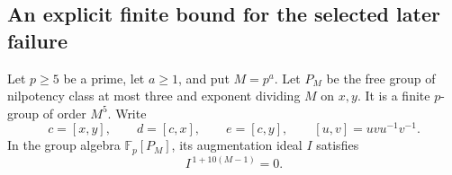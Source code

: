 \subsection{An explicit finite bound for the selected later failure}

\begin{lemma}
\label{lem:ghost-weighted-augmentation}
Let \(p\ge5\) be a prime, let \(a\ge1\), and put \(M=p^a\).
Let \(P_M\) be the free group of nilpotency class at most three
and exponent dividing \(M\) on \(x,y\). It is a finite \(p\)-group
of order \(M^5\). Write
\[
 c=[x,y],\qquad d=[c,x],\qquad e=[c,y],
 \qquad [u,v]=uvu^{-1}v^{-1}.
 \tag{FB.1}
\]
In the group algebra \(\mathbb F_p[P_M]\), its augmentation
ideal \(I\) satisfies
\[
 I^{\,1+10(M-1)}=0.
 \tag{FB.2}
\]
\end{lemma}

